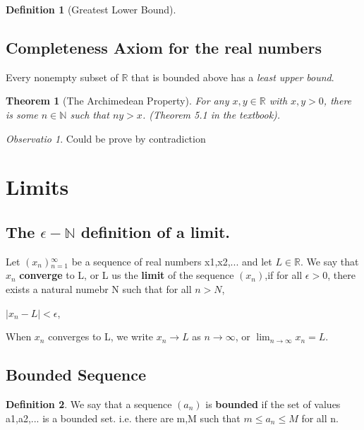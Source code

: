 \documentclass{article}
\newtheorem{theorem}{Theorem}[section]
\theoremstyle{definition}
\newtheorem{definition}{Definition}[section]
\theoremstyle{definition}
\theoremstyle{remark}
\newtheorem{remark}{Observatio}[section]
\begin{document}
\begin{definition}[Greatest Lower Bound]
\end{definition}

\subsection{Completeness Axiom for the real numbers}
Every nonempty subset of $\mathbb{R}$ that is bounded above has a \emph{least upper bound}.\\

\begin{theorem}[The Archimedean Property]
For any $x,y\in \mathbb{R}$ with $x,y>0$, there is some $n\in \mathbb{N}$ such that $ny>x$. (Theorem 5.1 in the textbook).
\end{theorem}
\begin{remark}
Could be prove by contradiction
\end{remark}

\newpage

\section {Limits}

\subsection{The $\epsilon-\mathbb{N}$ definition of a limit.}
Let ${(x_{n})}{_{n=1}^{\infty}}$ be a sequence of real numbers x1,x2,... and let $L\in \mathbb{R}$. We say that $x_{n}$ \textbf{converge} to L, or L us the \textbf{limit} of the sequence $(x_{n})$,if for all $\epsilon > 0$, there exists a natural numebr N such that for all $n>N$,\\

\begin{center}

$|x_{n}-L| < \epsilon$,\\

\end{center}


When $x_{n}$ converges to L, we write $x_{n} \rightarrow L$ as $n\rightarrow \infty$, or $\lim_{n\rightarrow \infty}x_{n}=L$.

\subsection{Bounded Sequence}

\begin{definition}
    We say that a sequence $(a_{n})$ is \textbf{bounded} if the set of values {a1,a2,...} is a bounded set. 
    i.e. there are m,M such that $m \leq a_{n} \leq M$ for all n.
\end{definition}
\end{document}
